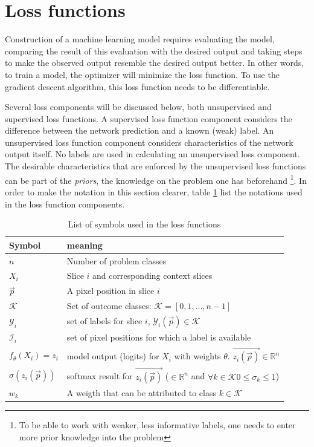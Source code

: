 
\section{Loss functions\label{sec:LossFunctions}}
\par{
    Construction of a machine learning model requires evaluating the model, comparing the result of this evaluation with the desired output and taking steps to make the observed output resemble the desired output better.
    In other words, to train a model, the optimizer will minimize the loss function.
    To use the gradient descent algorithm, this loss function needs to be differentiable.
}
\par{
    Several loss components will be discussed below, both unsupervised and supervised loss functions.
    A supervised loss function component considers the difference between the network prediction and a known (weak) label.
    An unsupervised loss function component considers characteristics of the network output itself. No labels are used in calculating an unsupervised loss component.
    The desirable characteristics that are enforced by the unsupervised loss functions can be part of the \textit{priors}, the knowledge on the problem one has beforehand
    \footnote{To be able to work with weaker, less informative labels, one needs to enter more prior knowledge into the problem}. 
}
In order to make the notation in this section clearer, table \ref{tab:loss_notations} list the notations used in the loss function components.
\begin{table}
 
    \begin{tabular}{ l l } 
     \hline
     \hline
     Symbol & meaning \\
     \hline 
    $n$                 & Number of problem classes \\
    $X_i$               & Slice $i$ and corresponding context slices   \\ 
    $\vec{p}$           & A pixel position in slice $i$ \\
    $\mathcal{K}$       & Set of outcome classes: $\mathcal{K} = [0, 1, \dots, n-1]$ \\
    $\mathcal{Y}_i$     & set of labels for slice $i$, $\mathcal{Y}_i(\vec{p}) \in \mathcal{K}$  \\
    $\mathcal{I}_i$     & set of pixel positions for which a label is available \\
    $f_\theta(X_i)=z_i$ & model output (logits) for $X_i$ with weights $\theta$. $\vec{z_i(\vec{p})}\in \mathbb{R}^n$ \\
    $\sigma(z_i(\vec{p}))$   & softmax result for $\vec{z_i(\vec{p})}$ ($\in \mathbb{R}^n$ and $\forall k\in \mathcal{K} 0\leq\sigma_k\leq1$) \\
    $w_k$ & A weigth that can be attributed to class $k \in \mathcal{K}$ \\
     \hline
     \hline
    \end{tabular}
    \caption{List of symbols used in the loss functions\label{tab:loss_notations}}

\end{table}
